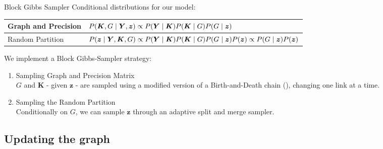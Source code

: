 \begin{frame}{Block Gibbs Sampler}
    Conditional distributions for our model:
    
    \begin{table}[tb]
        \centering
        \begin{tabular}{ll}
        \toprule
        Graph and Precision & $\small P(\bm{K},G \mid \bm{Y},\bm{z}) \propto P(\bm{Y} \mid \bm{K})P(\bm{K} \mid {G}) P(G \mid \bm{z})$ \\
        \hline
        Random Partition & $\small P(\bm{z} \mid \bm{Y},\bm{K},G) \propto P(\bm{Y} \mid \bm{K})P(\bm{K} \mid {G})P(G \mid \bm{z})P(\bm{z}) \propto P(G \mid \bm{z})P(\bm{z}) $ \\
        \bottomrule
        \end{tabular}
    \end{table}

    \pause 

    We implement a Block Gibbs-Sampler strategy:
    \begin{enumerate}
        \item \alert{Sampling Graph and Precision Matrix}\\
        $G$ and $\bm{K}$ - given $\bm{z}$ - are sampled using a modified version of a Birth-and-Death chain (\cite{mohammadiBayesianStructureLearning2015a}), changing one link at a time.
        \item \alert{Sampling the Random Partition}\\
        Conditionally on $G$, we can sample $\bm{z}$ through an adaptive split and merge\vphantom{changepoint} sampler.
    \end{enumerate}
\end{frame}

\subsection{Updating the graph}

